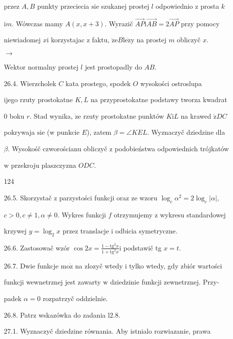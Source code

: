 \documentclass[a4paper,12pt]{article}
\begin{document}
przez $A, B$ punkty przeciecia $\mathrm{s}\mathrm{i}\mathrm{e}$ szukanej prostej $l$ odpowiednio $\mathrm{z}$ prosta $k$

$\mathrm{i}m$. Wówczas mamy $A(x,x+3)$. Wyrazič $\vec{AP}\mathrm{i}\vec{AB}=2\vec{AP}$ przy pomocy

niewiadomej $x \mathrm{i}$ korzystajac $\mathrm{z}$ faktu, $\dot{\mathrm{z}}\mathrm{e} B \mathrm{l}\mathrm{e}\dot{\mathrm{z}}\mathrm{y}$ na prostej $m$ obliczyč $x.$

$\rightarrow$

Wektor normalny prostej $l$ jest prostopadly do $AB.$

26.4. Wierzcholek $C$ kata prostego, spodek $O$ wysokości ostroslupa

ijego rzuty prostokatne $K, L$ na przyprostokatne podstawy tworza kwadrat

$0$ boku $r$. Stad wynika, $\dot{\mathrm{z}}\mathrm{e}$ rzuty prostokatne punktów $K\mathrm{i}L$ na krawed $\acute{\mathrm{z}}DC$

pokrywaja $\mathrm{s}\mathrm{i}\mathrm{e}$ ($\mathrm{w}$ punkcie $E$), zatem $\beta=\angle KEL$. Wyznaczyč dziedzine dla

$\beta$. Wysokośč czworościanu obliczyč $\mathrm{z}$ podobieństwa odpowiednich trójkatów

$\mathrm{w}$ przekroju plaszczyzna $ODC.$





124

26.5. Skorzystač $\mathrm{z}$ parzystości funkcji oraz ze wzoru $\log_{c}\alpha^{2}=2\log_{c}|\alpha|,$

$c>0, c\neq 1, \alpha\neq 0$. Wykres funkcji $f$ otrzymujemy $\mathrm{z}$ wykresu standardowej

krzywej $y=\log_{2}x$ przez translacje $\mathrm{i}$ odbicia symetryczne.

26.6. Zastosowač wzór $\displaystyle \cos 2x=\frac{1-\mathrm{t}\mathrm{g}^{2}x}{1+\mathrm{t}\mathrm{g}^{2}x}\mathrm{i}$ podstawič tg $x=t.$

26.7. Dwie funkcje $\mathrm{m}\mathrm{o}\dot{\mathrm{z}}$ na zlozyč wtedy $\mathrm{i}$ tylko wtedy, gdy zbiór wartości

funkcji wewnetrznej jest zawarty $\mathrm{w}$ dziedzinie funkcji zewnetrznej. Przy-

padek $\alpha=0$ rozpatrzyč oddzielnie.

26.8. Patrz wskazówka do zadania l2.8.

27.1. Wyznaczyč dziedzine równania. Aby istnialo rozwiazanie, prawa
\end{document}
